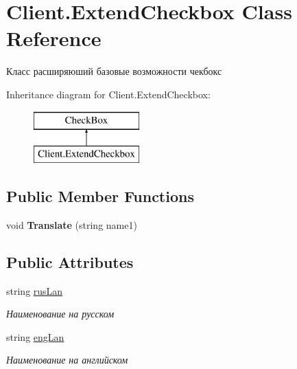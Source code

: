 \hypertarget{class_client_1_1_extend_checkbox}{}\section{Client.\+Extend\+Checkbox Class Reference}
\label{class_client_1_1_extend_checkbox}


Класс расширяюший базовые возможности чекбокс  


Inheritance diagram for Client.\+Extend\+Checkbox\+:\begin{figure}[H]
\begin{center}
\leavevmode
\includegraphics[height=2.000000cm]{class_client_1_1_extend_checkbox}
\end{center}
\end{figure}
\subsection*{Public Member Functions}
\begin{DoxyCompactItemize}
\item 
\hypertarget{class_client_1_1_extend_checkbox_af93d9c763cced54baaed7741f3003e57}{}\label{class_client_1_1_extend_checkbox_af93d9c763cced54baaed7741f3003e57} 
void {\bfseries Translate} (string name1)
\end{DoxyCompactItemize}
\subsection*{Public Attributes}
\begin{DoxyCompactItemize}
\item 
string \hyperlink{class_client_1_1_extend_checkbox_a89930618ff403ae6714aaf3b6983bf81}{rus\+Lan}
\begin{DoxyCompactList}\small\item\em Наименование на русском \end{DoxyCompactList}\item 
string \hyperlink{class_client_1_1_extend_checkbox_ae2b4e37f89f3ead5c2f873d014f62cb7}{eng\+Lan}
\begin{DoxyCompactList}\small\item\em Наименование на английском \end{DoxyCompactList}\end{DoxyCompactItemize}



